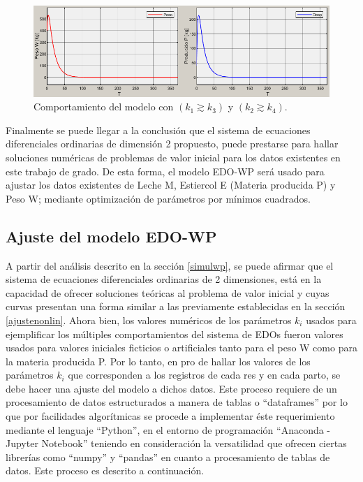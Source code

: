 \begin{itemize}
        \begin{figure}[H]
           \centering
           \includegraphics[scale=0.75]{img/k1MAPk3_k2MAPk4_k1Mk2.png}
           \caption{Comportamiento del modelo con $(k_{1}\gtrsim k_{3})$ y $(k_{2}\gtrsim k_{4})$. \label{kiMAPpng}}
        \end{figure}
            
\end{itemize}

Finalmente se puede llegar a la conclusión que el sistema de ecuaciones diferenciales ordinarias de dimensión 2 propuesto, puede prestarse para hallar soluciones numéricas de problemas de valor inicial para los datos existentes en este trabajo de grado. De esta forma, el modelo EDO-WP será usado para ajustar los datos existentes de Leche M, Estiercol E (Materia producida P) y Peso W; mediante optimización de parámetros por mínimos cuadrados.

\pagebreak
\subsection{Ajuste del modelo EDO-WP}\label{ajustemod}

A partir del análisis descrito en la sección \ref{simulwp}, se puede afirmar que el sistema de ecuaciones diferenciales ordinarias de 2 dimensiones, está en la capacidad de ofrecer soluciones teóricas al problema de valor inicial y cuyas curvas presentan una forma similar a las previamente establecidas en la sección \ref{ajustenonlin}.
Ahora bien, los valores numéricos de los parámetros $k_{i}$ usados para ejemplificar los múltiples comportamientos del sistema de EDOs fueron valores usados para valores iniciales ficticios o artificiales tanto para el peso W como para la materia producida P. Por lo tanto, en pro de hallar los valores de los parámetros $k_{i}$ que corresponden a los registros de cada res y en cada parto, se debe hacer una ajuste del modelo a dichos datos. Este proceso requiere de un procesamiento de datos estructurados a manera de tablas o ``dataframes'' por lo que por facilidades algorítmicas se procede a implementar éste requerimiento mediante el lenguaje ``Python'', en el entorno de programación ``Anaconda - Jupyter Notebook'' teniendo en consideración la versatilidad que ofrecen ciertas librerías como ``numpy'' y ``pandas'' en cuanto a procesamiento de tablas de datos. Este proceso es descrito a continuación.

